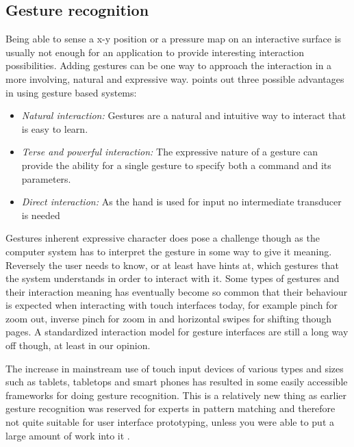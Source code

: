 \subsection{Gesture recognition}
\label{ch:textiletouch:gesture_recognition}
Being able to sense a x-y position or a pressure map on an interactive surface is usually not enough for an application to provide interesting interaction possibilities.
Adding gestures can be one way to approach the interaction in a more involving, natural and expressive way.
\citet{baudel1993charade} points out three possible advantages in using gesture based systems:
\begin{itemize}
  \item \emph{Natural interaction:} Gestures are a natural and intuitive way to interact that is easy to learn.
  \item \emph{Terse and powerful interaction:} The expressive nature of a gesture can provide the ability for a single gesture to specify both a command and its parameters.
  \item \emph{Direct interaction:} As the hand is used for input no intermediate transducer is needed
\end{itemize}
Gestures inherent expressive character does pose a challenge though as the computer system has to interpret the gesture in some way to give it meaning.
Reversely the user needs to know, or at least have hints at, which gestures that the system understands in order to interact with it.
Some types of gestures and their interaction meaning has eventually become so common that their behaviour is expected when interacting with touch interfaces today, for example pinch for zoom out, inverse pinch for zoom in and horizontal swipes for shifting though pages.
A standardized interaction model for gesture interfaces are still a long way off though, at least in our opinion. 

The increase in mainstream use of touch input devices of various types and sizes such as tablets, tabletops and smart phones has resulted in some easily accessible frameworks for doing gesture recognition.
This is a relatively new thing as earlier gesture recognition was reserved for experts in pattern matching and therefore not quite suitable for user interface prototyping, unless you were able to put a large amount of work into it \citep{wobbrock2007gestures}.  

